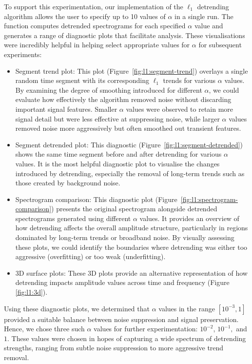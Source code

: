 To support this experimentation, our implementation of the $\ell_1$ detrending algorithm allows the user to specify up to 10 values of $\alpha$ in a single run. The function computes detrended spectrograms for each specified $\alpha$ value and generates a range of diagnostic plots that facilitate analysis. These visualisations were incredibly helpful in helping select appropriate values for $\alpha$ for subsequent experiments:
\begin{itemize}
    \item Segment trend plot: This plot (Figure~\ref{fig:l1:segment-trend}) overlays a single random time segment with its corresponding $\ell_1$ trends for various $\alpha$ values. By examining the degree of smoothing introduced for different $\alpha$, we could evaluate how effectively the algorithm removed noise without discarding important signal features. Smaller $\alpha$ values were observed to retain more signal detail but were less effective at suppressing noise, while larger $\alpha$ values removed noise more aggressively but often smoothed out transient features.
    \item Segment detrended plot: This diagnostic (Figure~\ref{fig:l1:segment-detrended}) shows the same time segment before and after detrending for various $\alpha$ values. It is the most helpful diagnostic plot to visualise the changes introduced by detrending, especially the removal of long-term trends such as those created by background noise.
    \item Spectrogram comparison: This diagnostic plot (Figure~\ref{fig:l1:spectrogram-comparison}) presents the original spectrogram alongside detrended spectrograms generated using different $\alpha$ values. It provides an overview of how detrending affects the overall amplitude structure, particularly in regions dominated by long-term trends or broadband noise. By visually assessing these plots, we could identify the boundaries where detrending was either too aggressive (overfitting) or too weak (underfitting).
    \item 3D surface plots: These 3D plots provide an alternative representation of how detrending impacts amplitude values across time and frequency (Figure \ref{fig:l1:3d}).
\end{itemize}

Using these diagnostic plots, we determined that $\alpha$ values in the range $[10^{-3}, 1]$ provided a suitable balance between noise suppression and signal preservation. Hence, we chose three such $\alpha$ values for further experimentation: $10^{-2}$, $10^{-1},$ and $1$. These values were chosen in hopes of capturing a wide spectrum of detrending strengths, ranging from subtle noise suppression to more aggressive trend removal.

